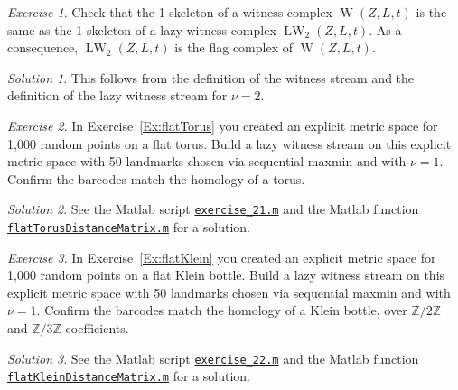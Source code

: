 \documentclass[amscd, amssymb, verbatim]{amsart}[12pt]
\theoremstyle{remark}
\theoremstyle{remark}
\newtheorem{exerciseSol}{Exercise}
\theoremstyle{remark}
\newtheorem*{solution}{Solution}
\DeclareMathOperator{\W}{W}
\DeclareMathOperator{\LW}{LW}
\newcommand{\Z}{\mathbb{Z}}
\begin{document}
\begin{exerciseSol}
Check that the 1-skeleton of a witness complex $\W(Z,L,t)$ is the same as the 1-skeleton of a lazy witness complex $\LW_2(Z,L,t)$. As a consequence, $\LW_2(Z,L,t)$ is the flag complex of $\W(Z,L,t)$.
\end{exerciseSol}

\begin{solution}
This follows from the definition of the witness stream and the definition of the lazy witness stream for $\nu = 2$. 
\end{solution}

\begin{exerciseSol}
In Exercise~\ref{Ex:flatTorus} you created an explicit metric space for 1,000 random points on a flat torus. Build a lazy witness stream on this explicit metric space with 50 landmarks chosen via sequential maxmin and with $\nu = 1$.  Confirm the barcodes match the homology of a torus. 
\end{exerciseSol}

\begin{solution}
See the Matlab script \href{https://github.com/appliedtopology/javaplex/tree/master/src/matlab/for_distribution/tutorial_solutions/exercise_21.m}{\texttt{exercise\_21.m}} and the Matlab function \href{https://github.com/appliedtopology/javaplex/tree/master/src/matlab/for_distribution/tutorial_solutions/flatTorusDistanceMatrix.m}{\texttt{flatTorusDistanceMatrix.m}} for a solution.
\end{solution}

\begin{exerciseSol}
In Exercise~\ref{Ex:flatKlein} you created an explicit metric space for 1,000 random points on a flat Klein bottle. Build a lazy witness stream on this explicit metric space with 50 landmarks chosen via sequential maxmin and with $\nu = 1$.  Confirm the barcodes match the homology of a Klein bottle, over $\Z/2\Z$ and $\Z/3\Z$ coefficients.
\end{exerciseSol}

\begin{solution}
See the Matlab script \href{https://github.com/appliedtopology/javaplex/tree/master/src/matlab/for_distribution/tutorial_solutions/exercise_22.m}{\texttt{exercise\_22.m}} and the Matlab function \href{https://github.com/appliedtopology/javaplex/tree/master/src/matlab/for_distribution/tutorial_solutions/flatKleinDistanceMatrix.m}{\texttt{flatKleinDistanceMatrix.m}} for a solution.
\end{solution}
\end{document}
